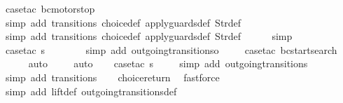 \begin{isabellebody}
\ {\isacharparenleft}case{\isacharunderscore}tac\ {\isachardoublequoteopen}bc{\isacharequal}motorstop{}{\isachardoublequoteclose}{\isacharparenright}\isanewline
\ \ \ \ \ \isamarkupfalse%
\ {\isacharparenleft}simp\ add{\isacharcolon}\ transitions\ choice{\isacharunderscore}def\ apply{\isacharunderscore}guards{\isacharunderscore}def\ Str{\isacharunderscore}def{\isacharparenright}\isanewline
\ \ \ \ \isamarkupfalse%
\ {\isacharparenleft}simp\ add{\isacharcolon}\ transitions\ choice{\isacharunderscore}def\ apply{\isacharunderscore}guards{\isacharunderscore}def\ Str{\isacharunderscore}def{\isacharparenright}\isanewline
\ \ \ \ \isamarkupfalse%
\ simp\isanewline
\isanewline
\ \ \isamarkupfalse%
\ {\isacharparenleft}case{\isacharunderscore}tac\ {\isachardoublequoteopen}s{\isasymin}{\isacharbraceleft}{}{\isacharcomma}\ {}{\isacharcomma}\ {}{\isacharcomma}\ {}{\isacharbraceright}{\isachardoublequoteclose}{\isacharparenright}\isanewline
\ \ \ \isamarkupfalse%
\ {\isacharparenleft}simp\ add{\isacharcolon}\ outgoing{\isacharunderscore}transitions{\isacharunderscore}o{\isacharparenright}\isanewline
\ \ \ \isamarkupfalse%
\ {\isacharparenleft}case{\isacharunderscore}tac\ {\isachardoublequoteopen}bc{\isacharequal}startsearch{\isachardoublequoteclose}{\isacharparenright}\isanewline
\ \ \ \ \isamarkupfalse%
\ auto{\isacharbrackleft}{}{\isacharbrackright}\isanewline
\ \ \ \isamarkupfalse%
\ auto{\isacharbrackleft}{}{\isacharbrackright}\isanewline
\isanewline
\ \ \isamarkupfalse%
\ {\isacharparenleft}case{\isacharunderscore}tac\ {\isachardoublequoteopen}s{\isacharequal}{}{\isachardoublequoteclose}{\isacharparenright}\isanewline
\ \ \ \isamarkupfalse%
\ {\isacharparenleft}simp\ add{\isacharcolon}\ outgoing{\isacharunderscore}transitions{\isacharunderscore}{}{\isacharparenright}\isanewline
\ \ \isamarkupfalse%
\ {\isacharparenleft}simp\ add{\isacharcolon}\ transitions{\isacharparenright}\isanewline
\ \ \isamarkupfalse%
\ choice{\isacharunderscore}return\ \isamarkupfalse%
\ fastforce\ \isanewline
\ \ \isamarkupfalse%
\ {\isacharparenleft}simp\ add{\isacharcolon}\ lift{\isacharunderscore}def\ outgoing{\isacharunderscore}transitions{\isacharunderscore}def{\isacharparenright}%
\endisatagproof
{\isafoldproof}%
%
\isadelimproof
\isanewline
%
\endisadelimproof
%
\isadelimtheory
\isanewline
%
\endisadelimtheory
%
\isatagtheory
{}\isamarkupfalse%
%
\endisatagtheory
{\isafoldtheory}%
%
\isadelimtheory
%
\endisadelimtheory
%
\end{isabellebody}%
